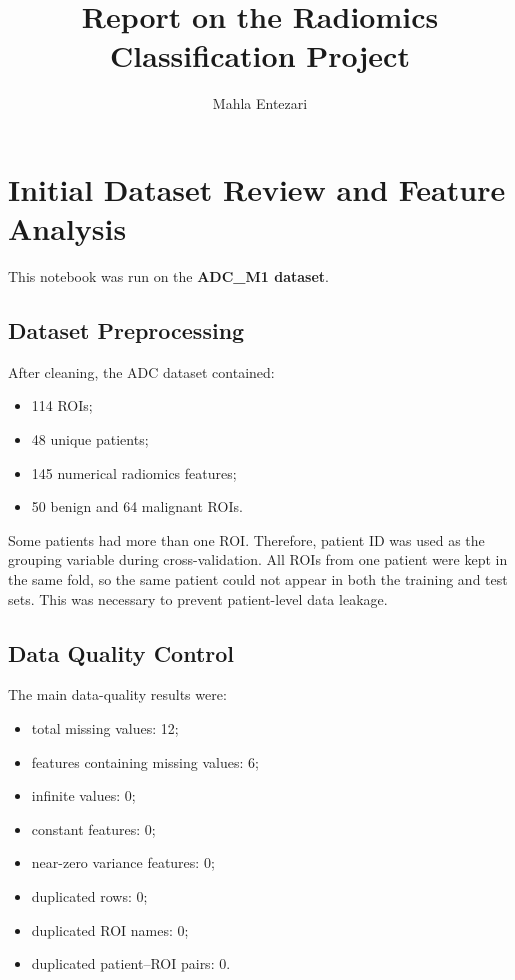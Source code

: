 \documentclass[10pt,a4paper]{article}
\title{Report on the Radiomics Classification Project}
\author{Mahla Entezari}
\begin{document}
\maketitle

\section{Initial Dataset Review and Feature Analysis}

This notebook was run on the \textbf{ADC\_M1 dataset}. 

\subsection{Dataset Preprocessing}

After cleaning, the ADC dataset contained:

\begin{itemize}[leftmargin=1.5em]
    \item 114 ROIs;
    \item 48 unique patients;
    \item 145 numerical radiomics features;
    \item 50 benign and 64 malignant ROIs.
\end{itemize}

Some patients had more than one ROI. Therefore, patient ID was used as the grouping variable during cross-validation. All ROIs from one patient were kept in the same fold, so the same patient could not appear in both the training and test sets. This was necessary to prevent patient-level data leakage.

\subsection{Data Quality Control}

The main data-quality results were:

\begin{itemize}[leftmargin=1.5em]
    \item total missing values: 12;
    \item features containing missing values: 6;
    \item infinite values: 0;
    \item constant features: 0;
    \item near-zero variance features: 0;
    \item duplicated rows: 0;
    \item duplicated ROI names: 0;
    \item duplicated patient--ROI pairs: 0.
\end{itemize}
\end{document}
